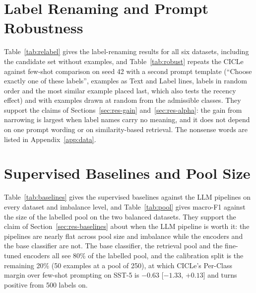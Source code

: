 




\section{Label Renaming and Prompt Robustness}
\label{app:relabel}

Table~\ref{tab:relabel} gives the label-renaming results for all six datasets, including the candidate set without examples, and Table~\ref{tab:robust} repeats the CICLe against few-shot comparison on seed 42 with a second prompt template (``Choose exactly one of these labels'', examples as Text and Label lines, labels in random order and the most similar example placed last, which also tests the recency effect) and with examples drawn at random from the admissible classes. They support the claims of Sections~\ref{sec:res-gain} and~\ref{sec:res-alpha}: the gain from narrowing is largest when label names carry no meaning, and it does not depend on one prompt wording or on similarity-based retrieval. The nonsense words are listed in Appendix~\ref{app:data}.




\section{Supervised Baselines and Pool Size}
\label{app:pool}

Table~\ref{tab:baselines} gives the supervised baselines against the LLM pipelines on every dataset and imbalance level, and Table~\ref{tab:pool} gives macro-F1 against the size of the labelled pool on the two balanced datasets. They support the claim of Section~\ref{sec:res-baselines} about when the LLM pipeline is worth it: the pipelines are nearly flat across pool size and imbalance while the encoders and the base classifier are not. The base classifier, the retrieval pool and the fine-tuned encoders all see 80\% of the labelled pool, and the calibration split is the remaining 20\% (50 examples at a pool of 250), at which CICLe's Per-Class margin over few-shot prompting on SST-5 is $-0.63$ [$-1.33$, $+0.13$] and turns positive from 500 labels on. %

